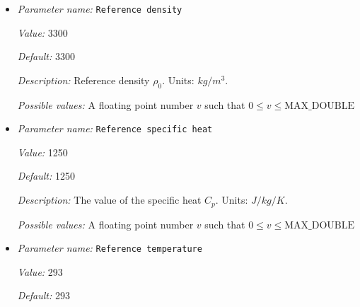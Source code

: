 \begin{itemize}
{\it Value:} 0


{\it Default:} 0


{\it Description:} Above this depth the compositional fields react: The first field gets converted to the second field. Units: $m$.


{\it Possible values:} A floating point number $v$ such that $0 \leq v \leq \text{MAX\_DOUBLE}$
\item {\it Parameter name:} {\tt Reference density}
\label{parameters:Material model/Composition reaction model/Reference density}
\label{parameters:Material_20model/Composition_20reaction_20model/Reference_20density}


{\it Value:} 3300


{\it Default:} 3300


{\it Description:} Reference density $\rho_0$. Units: $kg/m^3$.


{\it Possible values:} A floating point number $v$ such that $0 \leq v \leq \text{MAX\_DOUBLE}$
\item {\it Parameter name:} {\tt Reference specific heat}
\label{parameters:Material model/Composition reaction model/Reference specific heat}
\label{parameters:Material_20model/Composition_20reaction_20model/Reference_20specific_20heat}


{\it Value:} 1250


{\it Default:} 1250


{\it Description:} The value of the specific heat $C_p$. Units: $J/kg/K$.


{\it Possible values:} A floating point number $v$ such that $0 \leq v \leq \text{MAX\_DOUBLE}$
\item {\it Parameter name:} {\tt Reference temperature}
\label{parameters:Material model/Composition reaction model/Reference temperature}
\label{parameters:Material_20model/Composition_20reaction_20model/Reference_20temperature}


{\it Value:} 293


{\it Default:} 293



\end{itemize}
